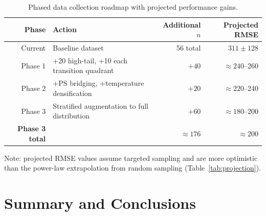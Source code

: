 \documentclass[12pt,a4paper]{article}
\begin{document}
\begin{table}[h]
\centering
\caption{Phased data collection roadmap with projected performance gains.}
\label{tab:roadmap}
\begin{tabular}{rlrr}
\toprule
Phase & Action & Additional $n$ & Projected RMSE \\
\midrule
Current & Baseline dataset & 56 total & $311 \pm 128$ \\
Phase 1 & +20 high-tail, +10 each transition quadrant & $+40$ & $\approx 240$--260 \\
Phase 2 & +PS bridging, +temperature densification & $+20$ & $\approx 220$--240 \\
Phase 3 & Stratified augmentation to full distribution & $+60$ & $\approx 180$--200 \\
\midrule
\textbf{Phase 3 total} & & \textbf{$\approx 176$} & \textbf{$\approx 200$} \\
\bottomrule
\end{tabular}
\end{table}

Note: projected RMSE values assume targeted sampling and are more
optimistic than the power-law extrapolation from random sampling
(Table~\ref{tab:projection}).

\section{Summary and Conclusions}
\label{sec:conclusions}
\end{document}
